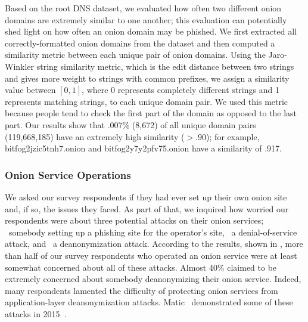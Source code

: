 Based on the root DNS dataset, we evaluated how often two different onion
domains are extremely similar to one another; this evaluation can potentially
shed light on how often an onion domain may be phished.  We first extracted all
correctly-formatted onion domains from the dataset and then computed a
similarity metric between each unique pair of onion domains.  Using the
Jaro-Winkler string similarity metric, which is the edit distance between two
strings and gives more weight to strings with common prefixes, we assign a
similarity value between $[0,1]$, where 0 represents completely different
strings and 1 represents matching strings, to each unique domain pair. We used
this metric because people tend to check the first part of the domain as opposed
to the last part.  Our results show that .007\% (8,672) of all unique domain
pairs (119,668,185) have an extremely high similarity ($> .90$); for example,
bitfog2jzic5tnh7.onion and bitfog2y7y2pfv75.onion have a similarity of .917.


\subsubsection{Onion Service Operations}

We asked our survey respondents if they had ever set up their own onion site
and, if so, the issues they faced.  As part of that, we inquired how worried our
respondents were about three potential attacks on their onion services;
\first~somebody setting up a phishing site for the operator's site, \second~a
denial-of-service attack, and \third~a deanonymization attack.  According to the
results, shown in , more than half of our
survey respondents who operated an onion service were at least somewhat
concerned about all of these attacks.  Almost 40\% claimed to be extremely
concerned about somebody deanonymizing their onion service.  Indeed, many
respondents lamented the difficulty of protecting onion services from
application-layer deanonymization attacks.  Matic \ea\ demonstrated some of
these attacks in 2015~\cite{Matic2015a}.

